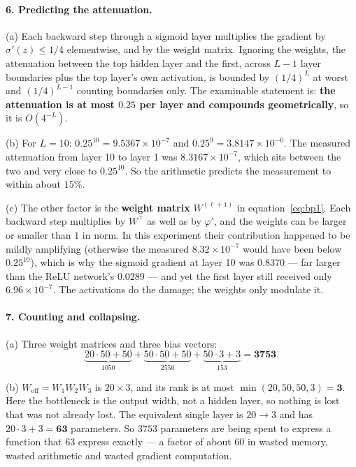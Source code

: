 \documentclass[11pt]{article}
\begin{document}
\paragraph{6. Predicting the attenuation.}

(a) Each backward step through a sigmoid layer multiplies the gradient by
$\sigma'(z) \le 1/4$ elementwise, and by the weight matrix. Ignoring the
weights, the attenuation between the top hidden layer and the first, across
$L - 1$ layer boundaries plus the top layer's own activation, is bounded by
$(1/4)^{L}$ at worst and $(1/4)^{L-1}$ counting boundaries only. The
examinable statement is: \textbf{the attenuation is at most $0.25$ per layer
and compounds geometrically}, so it is $O(4^{-L})$.

(b) For $L = 10$: $0.25^{10} = 9.5367\times10^{-7}$ and
$0.25^{9} = 3.8147\times10^{-6}$. The measured attenuation from layer 10 to
layer 1 was $8.3167\times10^{-7}$, which sits between the two and very close
to $0.25^{10}$. So the arithmetic predicts the measurement to within about
$15\%$.

(c) The other factor is the \textbf{weight matrix} $W^{(\ell+1)}$ in
equation~\eqref{eq:bp1}. Each backward step multiplies by $W^{\top}$ as well
as by $\varphi'$, and the weights can be larger or smaller than $1$ in norm.
In this experiment their contribution happened to be mildly amplifying
(otherwise the measured $8.32\times10^{-7}$ would have been below
$0.25^{10}$), which is why the sigmoid gradient at layer 10 was
$0.8370$ --- far larger than the ReLU network's $0.0289$ --- and yet the
first layer still received only $6.96\times10^{-7}$. The activations do the damage; the weights only
modulate it.

\paragraph{7. Counting and collapsing.}

(a) Three weight matrices and three bias vectors:
\[
  \underbrace{20{\cdot}50 + 50}_{1050}
  + \underbrace{50{\cdot}50 + 50}_{2550}
  + \underbrace{50{\cdot}3 + 3}_{153}
  = \mathbf{3753}.
\]

(b) $W_{\text{eff}} = W_1W_2W_3$ is $20 \times 3$, and its rank is at most
$\min(20, 50, 50, 3) = \mathbf{3}$. Here the bottleneck is the output width,
not a hidden layer, so nothing is lost that was not already lost. The
equivalent single layer is $20 \to 3$ and has $20{\cdot}3 + 3 = \mathbf{63}$
parameters. So $3753$ parameters are being spent to express a function that
$63$ express exactly --- a factor of about $60$ in wasted memory, wasted
arithmetic and wasted gradient computation.
\end{document}
